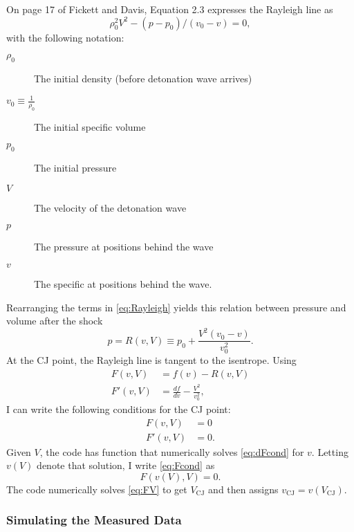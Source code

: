 \documentclass[11pt]{article}
\newcommand{\eos}{f}
\begin{document}
On page 17 of Fickett and Davis, Equation 2.3 expresses the Rayleigh
line as
\begin{equation}
  \label{eq:Rayleigh}
  \rho_0^2 V^2 - (p-p_0)/(v_0-v) = 0,
\end{equation}
with the following notation:
\begin{description}
\item[$\rho_0$] The initial density (before detonation wave arrives)
\item[$v_0\equiv\frac{1}{\rho_0}$] The initial specific volume
\item[$p_0$] The initial pressure
\item[$V$] The velocity of the detonation wave
\item[$p$] The pressure at positions behind the wave
\item[$v$] The specific at positions behind the wave.
\end{description}
Rearranging the terms in \eqref{eq:Rayleigh} yields this relation
between pressure and volume after the shock
\begin{equation*}
  p = R(v,V) \equiv p_0 + \frac{V^2(v_0-v)}{v_0^2}.
\end{equation*}
At the CJ point, the Rayleigh line is tangent to the isentrope.
Using
\begin{align*}
  F(v,V) &= \eos(v) - R(v,V) \\
  F'(v,V) &= \frac{d \eos}{d v} - \frac{V^2}{v_0^2},
\end{align*}
I can write the following conditions for the CJ point:
\begin{subequations}
  \begin{align}
    \label{eq:Fcond}
    F(v,V) &= 0 \\
    \label{eq:dFcond}
    F'(v,V) &= 0.
  \end{align}
\end{subequations}
Given $V$, the code has function that numerically solves
\eqref{eq:dFcond} for $v$.  Letting $v(V)$ denote that solution, I
write \eqref{eq:Fcond} as
\begin{equation}
  \label{eq:FV}
  F(v(V),V) = 0.
\end{equation}
The code numerically solves \eqref{eq:FV} to get $V_{\text{CJ}}$ and
then assigns $v_{\text{CJ}} = v(V_{\text{CJ}})$.

\subsubsection{Simulating the Measured Data}
\label{sec:stick-sim}
\end{document}
